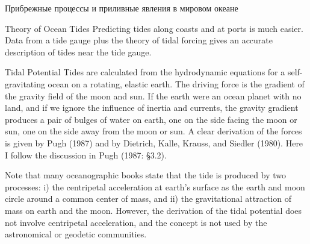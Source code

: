 \begin{chapter}{Прибрежные процессы и приливные явления в мировом океане}
\begin{section}{Theory of Ocean Tides}
Predicting tides along coasts and at ports is much easier. Data from a
tide gauge plus the theory of tidal forcing gives an accurate
description of tides near the tide gauge.
%

\begin{paragraph}{Tidal Potential}
Tides are calculated from the hydrodynamic
equations for a self-gravitating ocean on a rotating, elastic
earth. The driving force is the gradient of the gravity field of the
moon and sun. If the earth were an ocean planet with no
land, and if we ignore the influence of inertia and currents, the
gravity gradient produces a pair of bulges of water on earth, one on
the side facing the moon or sun, one on the side away from the moon or
sun. A clear derivation of the forces is given by Pugh (1987) and by
Dietrich, Kalle, Krauss, and Siedler (1980). Here I follow the
discussion in Pugh (1987: \S 3.2).
%

Note that many oceanographic books state that the tide is produced by
two processes: i) the centripetal acceleration at earth's surface as
the earth and moon circle around a common center of mass, and ii) the
gravitational attraction of mass on earth and the moon. However, the
derivation of the tidal potential does not involve centripetal
acceleration, and the concept is not used by the astronomical or
geodetic communities.
%


\end{paragraph}
\end{section}
\end{chapter}
